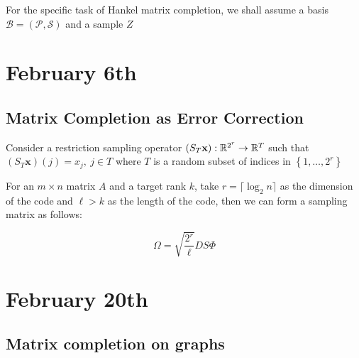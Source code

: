 \documentclass[12pt]{article}
\begin{document}
For the specific task of Hankel matrix completion, we shall assume a basis $\mathcal{B}= \left(\mathcal{P},\mathcal{S}\right)$ and a sample $Z$


\section{February 6th}

\subsection{Matrix Completion as Error Correction}

Consider a restriction sampling operator $(S_T\mathbf{x}):\mathbb{R}^{2^r}\rightarrow \mathbb{R}^T$ such that $(S_T\mathbf{x})(j) = x_j,\:j\in T$ where $T$ is a random subset of indices in $\left\{1,\dots, 2^r\right\}$

For an $m\times n$ matrix $A$ and a target rank $k$, take $r = \lceil \log_2{n} \rceil$ as the dimension of the code and $\ell > k$ as the length of the code, then we can form a sampling matrix as follows:

\begin{equation}
    \Omega = \sqrt{\frac{2^r}{\ell}}DS\Phi
\end{equation}

\section{February 20th}

\subsection{Matrix completion on graphs}



\newpage
\printbibliography
\end{document}
